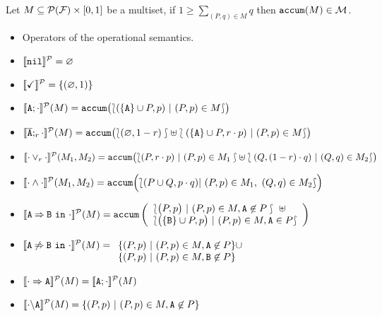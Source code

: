 \bprop\label{prop:pr:accum}
 Let $M\subseteq {\cal P}({\cal F})\times [0,1]$ be a multiset, if $1\geq\sum_{(P,q)\in M} q$
 then $\mathtt{accum}(M)\in{\cal M}$.
\eprop


\begin{itemize}
\item Operators of the operational semantics.
\end{itemize}


\bdfn\label{def:semantic:operators}

  \begin{itemize}\mbox{ }

  \item $[\![\mathtt{nil}]\!]^{\cal P}=\varnothing$

  \item $[\![\checkmark]\!]^{\cal P}=\{(\varnothing,1)\}$

  \item
    $[\![\mathtt{A};\cdot]\!]^{\cal P}(M)=
      \mathtt{accum}\bigl(\lbag(\{\mathtt{A}\}\cup P,p)\ |\ (P,p)\in M\rbag\bigr)
         $

  \item
    $[\![\overline{\mathtt{A}};_{r}\cdot]\!]^{\cal P}(M)=
                \mathtt{accum}\bigl(\lbag(\varnothing , 1-r )\rbag\uplus\lbag (\{\mathtt{A}\}\cup P, r\cdot p ) \ |\ (P,p) \in M\rbag\bigr)$

  \item
    $[\![\cdot\mathbin{\lor}_{r}\cdot]\!]^{\cal P}(M_{1},M_{2})=\mathtt{accum}\bigl(\lbag(P,r\cdot p  ) \ |\ (P,p) \in
    M_{1}\rbag \uplus \lbag(Q, (1-r)\cdot q  ) \ |\ (Q,q) \in M_{2}\rbag\bigr) $
  \item
    $
        [\![\cdot\mathbin{\wedge}\cdot]\!]^{\cal P}(M_{1},M_{2})= \mathtt{accum}\Bigl(
                \lbag (P\cup Q, p\cdot q)  |\ (P,p) \in M_{1},\ (Q,q) \in M_{2}\rbag\Bigr)
    $

  \item
    $[\![\mathtt{A}\mathbin{\Rightarrow}\mathtt{B}\ \mathtt{in}\ \cdot]\!]^{\cal P}(M)=\mathtt{accum}\left(\begin{array}{l}
      \lbag\bigl(P,p\bigr)\ |\  (P,p)\in M, \mathtt{A}\not\in P\rbag\ \uplus\\
      \lbag\bigl(\{\mathtt{B}\}\cup P ,p\bigr)\ |\ (P,p)\in M, \mathtt{A}\in P\rbag \\
      \end{array}\right)$

  \item
    $[\![\mathtt{A}\mathbin{\not\Rightarrow}\mathtt{B}\ \mathtt{in}\ \cdot]\!]^{\cal P}(M)=\begin{array}[t]{l}
      \{(P,p)\ |\ (P,p)\in M, \mathtt{A}\not\in P\}\cup\\
      \{(P,p)\ |\ (P,p)\in M, \mathtt{B}\not\in P\}
      \end{array}$

    \item $[\![\cdot\Rightarrow\mathtt{A}]\!]^{\cal P}(M) = [\![\mathtt{A};{\cdot}]\!]^{\cal P}(M)$

    \item
      $[\![\cdot\backslash\mathtt{A}]\!]^{\cal P}(M) = \{(P,p)\ |\ (P, p) \in M, \mathtt{A}\not\in P      \}$

  \end{itemize}
\edfn

